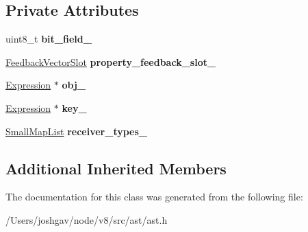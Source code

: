 \subsection*{Private Attributes}
\begin{DoxyCompactItemize}
\item 
uint8\+\_\+t {\bfseries bit\+\_\+field\+\_\+}\hypertarget{classv8_1_1internal_1_1_property_af1b0b5a2a98edc1d8a37c3bfbc0ef213}{}\label{classv8_1_1internal_1_1_property_af1b0b5a2a98edc1d8a37c3bfbc0ef213}

\item 
\hyperlink{classv8_1_1internal_1_1_feedback_vector_slot}{Feedback\+Vector\+Slot} {\bfseries property\+\_\+feedback\+\_\+slot\+\_\+}\hypertarget{classv8_1_1internal_1_1_property_a1304edb28da48672ce5ea4003ab18637}{}\label{classv8_1_1internal_1_1_property_a1304edb28da48672ce5ea4003ab18637}

\item 
\hyperlink{classv8_1_1internal_1_1_expression}{Expression} $\ast$ {\bfseries obj\+\_\+}\hypertarget{classv8_1_1internal_1_1_property_ab01bccf13c44c1222132f31ff6b4fb0f}{}\label{classv8_1_1internal_1_1_property_ab01bccf13c44c1222132f31ff6b4fb0f}

\item 
\hyperlink{classv8_1_1internal_1_1_expression}{Expression} $\ast$ {\bfseries key\+\_\+}\hypertarget{classv8_1_1internal_1_1_property_aa2a395bb68be3e40cb5c9094defff489}{}\label{classv8_1_1internal_1_1_property_aa2a395bb68be3e40cb5c9094defff489}

\item 
\hyperlink{classv8_1_1internal_1_1_small_map_list}{Small\+Map\+List} {\bfseries receiver\+\_\+types\+\_\+}\hypertarget{classv8_1_1internal_1_1_property_a13289428a2b9328fe3efc63c19e60b2d}{}\label{classv8_1_1internal_1_1_property_a13289428a2b9328fe3efc63c19e60b2d}

\end{DoxyCompactItemize}
\subsection*{Additional Inherited Members}


The documentation for this class was generated from the following file\+:\begin{DoxyCompactItemize}
\item 
/\+Users/joshgav/node/v8/src/ast/ast.\+h\end{DoxyCompactItemize}
